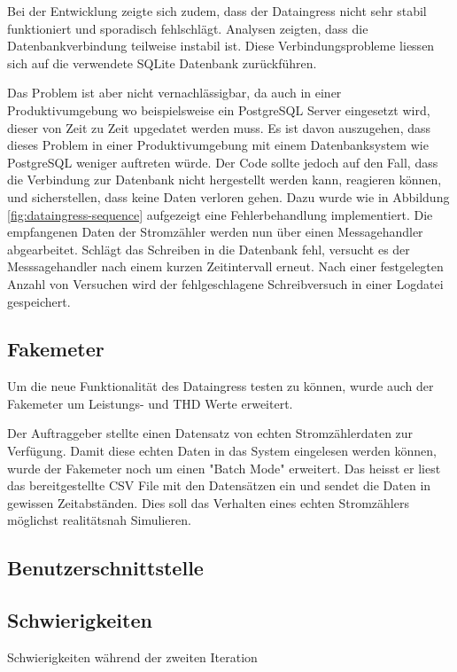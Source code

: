 Bei der Entwicklung zeigte sich zudem, dass der Dataingress nicht sehr stabil
funktioniert und sporadisch fehlschlägt. Analysen zeigten, dass
die Datenbankverbindung teilweise instabil ist. 
Diese Verbindungsprobleme liessen sich auf die verwendete SQLite Datenbank zurückführen.

Das Problem ist aber nicht vernachlässigbar, da auch in einer
Produktivumgebung wo beispielsweise ein PostgreSQL Server eingesetzt wird,
dieser von Zeit zu Zeit upgedatet werden muss.
Es ist davon auszugehen, dass dieses Problem in einer Produktivumgebung mit einem Datenbanksystem wie PostgreSQL
weniger auftreten würde.
Der Code sollte jedoch auf den Fall, dass die Verbindung zur Datenbank nicht hergestellt werden kann, reagieren können,
und sicherstellen, dass keine Daten verloren gehen.
Dazu wurde wie in Abbildung \ref{fig:dataingress-sequence} aufgezeigt
eine Fehlerbehandlung implementiert. 
Die empfangenen Daten der Stromzähler
werden nun über einen Messagehandler abgearbeitet.
Schlägt das Schreiben in die Datenbank fehl, versucht es der Messsagehandler nach einem kurzen Zeitintervall erneut.
Nach einer festgelegten Anzahl von Versuchen wird der fehlgeschlagene Schreibversuch in einer Logdatei gespeichert.

\subsection{Fakemeter}

Um die neue Funktionalität des Dataingress testen zu können, wurde auch der
Fakemeter um Leistungs- und \ac{THD} Werte erweitert.

Der Auftraggeber stellte einen Datensatz von echten Stromzählerdaten
zur Verfügung. Damit diese echten Daten in das System eingelesen werden können,
wurde der Fakemeter noch um einen "Batch Mode" erweitert. Das heisst
er liest das bereitgestellte CSV File mit den Datensätzen ein und sendet die Daten in
gewissen Zeitabständen. Dies soll das Verhalten eines echten Stromzählers
möglichst realitätsnah Simulieren.

\subsection{Benutzerschnittstelle}

\subsection{Schwierigkeiten}
Schwierigkeiten während der zweiten Iteration
